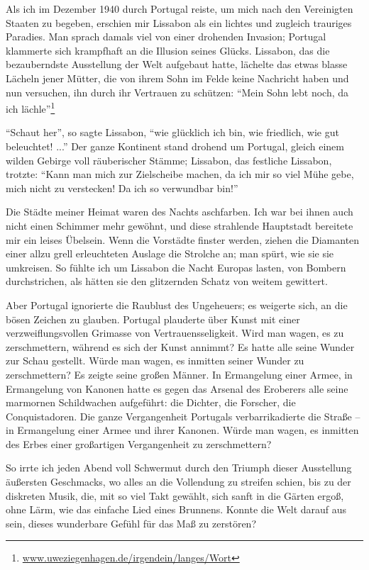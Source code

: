 \documentclass[12pt,ngerman,parskip=half,draft]{scrartcl}
\begin{document}
Als ich im Dezember 1940 durch Portugal reiste, um mich nach den Vereinigten Staaten zu begeben, erschien mir Lissabon als ein lichtes und zugleich trauriges Paradies. Man sprach damals viel von einer drohenden Invasion; Portugal klammerte sich krampfhaft an die Illusion seines Glücks. Lissabon, das die bezauberndste Ausstellung der Welt aufgebaut hatte, lächelte das etwas blasse Lächeln jener Mütter, die von ihrem Sohn im Felde keine Nachricht haben und nun versuchen, ihn durch ihr Vertrauen zu schützen: \enquote{Mein Sohn lebt noch, da ich lächle}\footnote{\url{www.uweziegenhagen.de/irgendein/langes/Wort}}

\enquote{Schaut her}, so sagte Lissabon, \enquote{wie glücklich ich bin, wie friedlich, wie gut beleuchtet! ...} Der ganze Kontinent stand drohend um Portugal, gleich einem wilden Gebirge voll räuberischer Stämme; Lissabon, das festliche Lissabon, trotzte: \enquote{Kann man mich zur Zielscheibe machen, da ich mir so viel Mühe gebe, mich nicht zu verstecken! Da ich so verwundbar bin!}

Die Städte meiner Heimat waren des Nachts aschfarben. Ich war bei ihnen auch nicht einen Schimmer mehr gewöhnt, und diese strahlende Hauptstadt bereitete mir ein leises Übelsein. Wenn die Vorstädte finster werden, ziehen die Diamanten einer allzu grell erleuchteten Auslage die Strolche an; man spürt, wie sie sie umkreisen. So fühlte ich um Lissabon die Nacht Europas lasten, von Bombern durchstrichen, als hätten sie den glitzernden Schatz von weitem gewittert.

Aber Portugal ignorierte die Raublust des Ungeheuers; es weigerte sich, an die bösen Zeichen zu glauben. Portugal plauderte über Kunst mit einer verzweiflungsvollen Grimasse von Vertrauensseligkeit. Wird man wagen, es zu zerschmettern, während es sich der Kunst annimmt? Es hatte alle seine Wunder zur Schau gestellt. Würde man wagen, es inmitten seiner Wunder zu zerschmettern? Es zeigte seine großen Männer. In Ermangelung einer Armee, in Ermangelung von Kanonen hatte es gegen das Arsenal des Eroberers alle seine marmornen Schildwachen aufgeführt: die Dichter, die Forscher, die Conquistadoren. Die ganze Vergangenheit Portugals verbarrikadierte die Straße -- in Ermangelung einer Armee und ihrer Kanonen. Würde man wagen, es inmitten des Erbes einer großartigen Vergangenheit zu zerschmettern?

So irrte ich jeden Abend voll Schwermut durch den Triumph dieser Ausstellung äußersten Geschmacks, wo alles an die Vollendung zu streifen schien, bis zu der diskreten Musik, die, mit so viel Takt gewählt, sich sanft in die Gärten ergoß, ohne Lärm, wie das einfache Lied eines Brunnens. Konnte die Welt darauf aus sein, dieses wunderbare Gefühl für das Maß zu zerstören?
\end{document}
